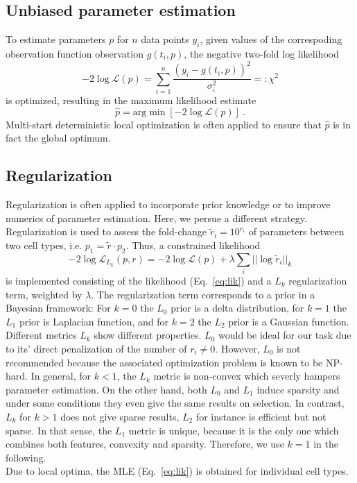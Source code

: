\documentclass{bioinfo}
\begin{document}
\subsection{Unbiased parameter estimation}

To estimate parameters $p$ for $n$ data points ${y_i}$, given values of the correspoding observation function observation $g(t_i,p)$, the negative two-fold log likelihood
\begin{equation}
-2\log \mathcal L(p) = \sum_{i=1}^n \frac{(y_i-g(t_i,p))^2}{\sigma_i^2} =: \chi^2\label{eq:lik}
\end{equation}
is optimized, resulting in the maximum likelihood estimate
\begin{equation}
\hat p = \text{arg}\min \left[ -2\log \mathcal L(p) \right] \:.
\end{equation}
Multi-start deterministic local optimization is often applied to ensure that $\hat p$ is in fact the global optimum.

\subsection{Regularization}
Regularization is often applied to incorporate prior knowledge or to improve numerics of parameter estimation.
Here, we persue a different strategy.
Regularization is used to assess the fold-change $\tilde r_i = 10^{r_i}$ of parameters between two cell types, i.e. $p_1 = \tilde r \cdot p_2$.
Thus, a constrained likelihood
\begin{equation}
-2\log \mathcal L_{L_k}(p,r) = -2\log \mathcal L(p) + \lambda \sum_i ||\log \tilde r_i||_k\label{eq:likreg}%
\end{equation}
is implemented consisting of the likelihood (Eq.~\ref{eq:lik}) and a $L_k$ regularization term, weighted by $\lambda$.
The regularization term corresponds to a prior in a Bayesian framework:
For $k=0$ the $L_0$ prior is a delta distribution, for $k=1$ the $L_1$ prior is Laplacian function, and for $k=2$ the $L_2$ prior is a Gaussian function.\\
Different metrics $L_k$ show different properties.
$L_0$ would be ideal for our task due to its' direct penalization of the number of $r_i \neq 0$.
However, $L_0$ is not recommended because the associated optimization problem is known to be NP-hard.
In general, for $k<1$, the $L_k$ metric is non-convex which severly hampers parameter estimation.
On the other hand, both $L_0$ and $L_1$ induce sparsity and under some conditions they even give the same results on selection.
In contrast, $L_k$ for $k>1$ does not give sparse results, $L_2$ for instance is efficient but not sparse.
In that sense, the $L_1$ metric is unique, because it is the only one which combines both features, convexity and sparsity.
Therefore, we use $k=1$ in the following.\\
Due to local optima, the MLE (Eq.~\ref{eq:lik}) is obtained for individual cell types.
\end{document}
